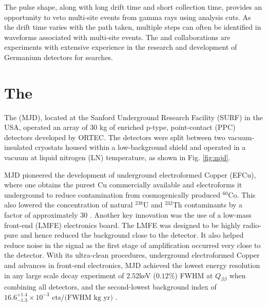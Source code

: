 The pulse shape, along with long drift time and short collection time, provides an opportunity to veto multi-site events from gamma rays using analysis cuts. As the drift time varies with the path taken, multiple steps can often be identified in waveforms associated with multi-site events. The {\MJ} and {\Gerda} collaborations are experiments with extensive experience in the research and development of Germanium detectors for {\onbb} searches.


\section{The {\MJD}}

The {\MJD} (MJD), located at the Sanford Underground Research Facility (SURF) in the USA, operated an array of 30 kg of enriched p-type, point-contact (PPC) detectors developed by ORTEC. The detectors were split between two vacuum-insulated cryostats housed within a low-background shield and operated in a vacuum at liquid nitrogen (LN) temperature, as shown in Fig. \ref{fig:mjd}. 

MJD pioneered the development of underground electroformed Copper (EFCu), where one obtains the purest Cu commercially available and electroforms it underground to reduce contamination from cosmogenically produced $^{60}$Co. This also lowered the concentration of natural $^{238}$U and $^{232}$Th contaminants by a factor of approximately 30 \cite{Abgrall:2016cct}. Another key innovation was the use of a low-mass front-end (LMFE) electronics board. The LMFE was designed to be highly radio-pure and hence reduced the background close to the detector. It also helped reduce noise in the signal as the first stage of amplification occurred very close to the detector. With its ultra-clean procedures, underground electroformed Copper and advances in front-end electronics, MJD achieved the lowest energy resolution in any large scale {\onbb} decay experiment of $2.52$keV ($0.12\%$) FWHM at $Q_{\beta\beta}$ when combining all detectors, and the second-lowest background index of $16.6^{+1.4}_{-1.3} \times 10^{-3} \text{ cts/(FWHM kg yr)}$ \cite{Majorana_final}.

